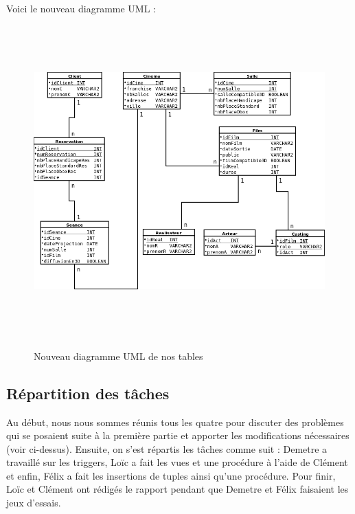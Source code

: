 \documentclass[a4paper,sffamily,12pt]{article}
\begin{document}
				Voici le nouveau diagramme UML : \\

				\newpage
				
					\begin{figure}[!h]		
						\hspace{-1cm}
						{\includegraphics[height=12cm]{picture/DiagrammeUML_corrige.png}}
						\caption{Nouveau diagramme UML de nos tables}
						\label{UML}
						\vspace{0.5cm}	
					\end{figure}
		
				\vspace{0.5cm}
					
		\subsection{Répartition des tâches}

				\vspace{0.5cm}

				Au début, nous nous sommes réunis tous les quatre pour discuter des problèmes qui se posaient suite à la première partie et apporter les modifications nécessaires (voir ci-dessus). Ensuite, on s'est répartis les tâches comme suit : Demetre a travaillé sur les triggers, Loïc a fait les vues et une procédure à l'aide de Clément et enfin, Félix a fait les insertions de tuples ainsi qu'une procédure. Pour finir, Loïc et Clément ont rédigés le rapport pendant que Demetre et Félix faisaient les jeux d'essais.
\end{document}
